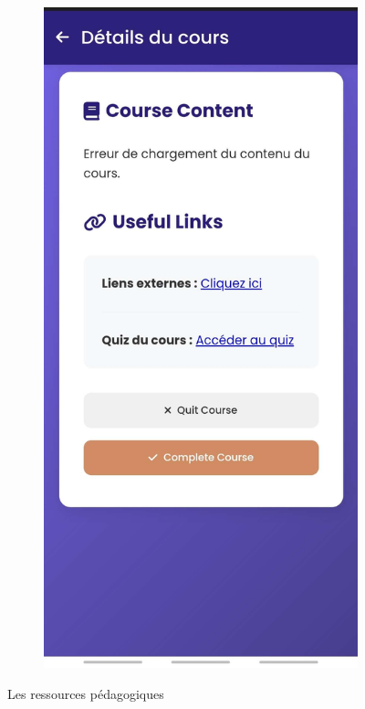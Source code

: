 \documentclass{article}
\begin{document}
\begin{figure}[H]
\begin{subfigure}[t]{0.3\textwidth}
    \label{fig:cou}
  \end{subfigure}
  \hspace{1cm}
  \begin{subfigure}[t]{0.3\textwidth}
    \centering
    \includegraphics[width=\textwidth]{picres5.jpg}
    
    \label{fig:cou2}
  \end{subfigure}
  \caption{Les ressources pédagogiques}
\end{figure}
\end{document}
